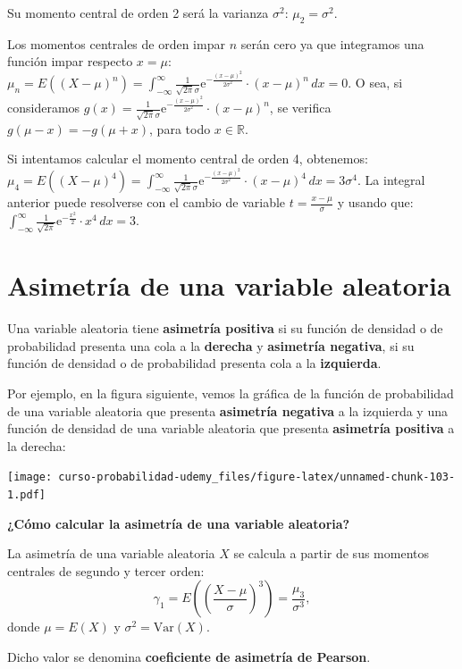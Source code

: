 \documentclass[]{book}
\begin{document}
Su momento central de orden 2 será la varianza \(\sigma^2\): \(\mu_2 =\sigma^2.\)

Los momentos centrales de orden impar \(n\) serán cero ya que integramos una función impar respecto \(x=\mu\):
\(\mu_n = E\left((X-\mu)^n\right)=\int_{-\infty}^\infty \frac{1}{\sqrt{2\pi}\sigma}\mathrm{e}^{-\frac{(x-\mu)^2}{2\sigma^2}}\cdot (x-\mu)^n\, dx = 0.\)
O sea, si consideramos \(g(x)=\frac{1}{\sqrt{2\pi}\sigma}\mathrm{e}^{-\frac{(x-\mu)^2}{2\sigma^2}}\cdot (x-\mu)^n\), se verifica \(g(\mu-x)=-g(\mu +x)\), para todo \(x\in\mathbb{R}\).

Si intentamos calcular el momento central de orden 4, obtenemos:
\(\mu_4 = E\left((X-\mu)^4\right)=\int_{-\infty}^\infty \frac{1}{\sqrt{2\pi}\sigma}\mathrm{e}^{-\frac{(x-\mu)^2}{2\sigma^2}}\cdot (x-\mu)^4\, dx = 3\sigma^4.\) La integral anterior puede resolverse con el cambio de variable \(t=\frac{x-\mu}{\sigma}\) y usando que: \(\int_{-\infty}^\infty \frac{1}{\sqrt{2\pi}}\mathrm{e}^{-\frac{x^2}{2}}\cdot x^4\, dx = 3.\)

\hypertarget{asimetruxeda-de-una-variable-aleatoria}{%
\section{Asimetría de una variable aleatoria}\label{asimetruxeda-de-una-variable-aleatoria}}

Una variable aleatoria tiene \textbf{asimetría positiva} si su función de densidad o de probabilidad presenta una cola a la
\textbf{derecha} y \textbf{asimetría negativa}, si su función de densidad o de probabilidad presenta cola a la \textbf{izquierda}.

Por ejemplo, en la figura siguiente, vemos la gráfica de la función de probabilidad de una variable aleatoria que presenta \textbf{asimetría negativa} a la izquierda y una función de densidad de una variable aleatoria que presenta \textbf{asimetría positiva} a la derecha:

\texttt{[image: curso-probabilidad-udemy\_files/figure-latex/unnamed-chunk-103-1.pdf]}

\textbf{¿Cómo calcular la asimetría de una variable aleatoria?}

La asimetría de una variable aleatoria \(X\) se calcula a partir de sus momentos centrales de segundo y tercer orden:
\[
\gamma_1 = E\left({\left(\frac{X-\mu}{\sigma}\right)}^3\right)=\frac{\mu_3}{\sigma^3},
\]
donde \(\mu = E(X)\) y \(\sigma^2 =\mathrm{Var}(X)\).

Dicho valor se denomina \textbf{coeficiente de asimetría de Pearson}.
\end{document}
